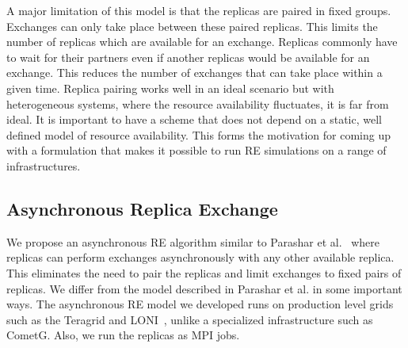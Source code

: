 \documentclass[a4paper,10pt]{article}
\newcommand{\jhanote}[1]{ {\textcolor{red} { ***shantenu: #1 }}}
\newcommand{\athotanote}[1]{ {\textcolor{green} { ***athota: #1 }}}
\newcommand{\jhanote}[1]{}
\newcommand{\athotanote}[1]{}
\begin{document}
A major limitation of this model is that the replicas are paired in fixed groups. 
Exchanges can only take place between these paired replicas.
This limits the number of replicas which are available for an exchange. 
Replicas commonly have to wait for their partners even if another replicas 
would be available for an exchange. %
This reduces the number of exchanges that can take place within a given time.
Replica pairing works well in an ideal scenario but with heterogeneous systems, 
where the resource availability fluctuates, it is far from ideal. It is 
important to have a scheme that does not depend on a static, well defined 
model of resource availability. This forms the motivation for coming up 
with a formulation that makes it possible to run RE simulations on a range of infrastructures.

  

  
\subsection{Asynchronous Replica Exchange}

We propose an asynchronous RE algorithm similar to Parashar et al.~\cite{parashar_arepex}
where replicas can perform exchanges asynchronously with any other available replica. This eliminates the need to pair the replicas and limit exchanges to fixed pairs of replicas. We differ from the model described in Parashar et al. in some important ways. The asynchronous RE model we developed runs on production level grids such as the Teragrid and LONI~\cite{LONI_web}, unlike a specialized infrastructure such as CometG. Also, we run the replicas as MPI jobs.
\end{document}
